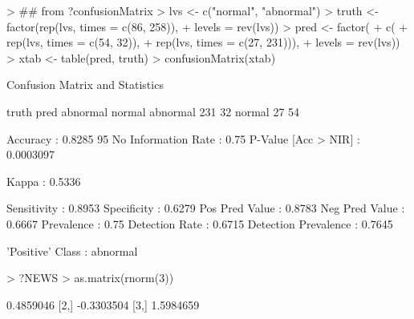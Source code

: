 \documentclass[12pt]{article}
\newenvironment{Schunk}{}{}
\begin{document}
\begin{Schunk}
\begin{Sinput}
> ## from ?confusionMatrix
> lvs <- c("normal", "abnormal")
> truth <- factor(rep(lvs, times = c(86, 258)),
+                 levels = rev(lvs))
> pred <- factor(
+                c(
+                  rep(lvs, times = c(54, 32)),
+                  rep(lvs, times = c(27, 231))),
+                levels = rev(lvs))
> xtab <- table(pred, truth)
> confusionMatrix(xtab)
\end{Sinput}
\begin{Soutput}
Confusion Matrix and Statistics

          truth
pred       abnormal normal
  abnormal      231     32
  normal         27     54
                                        
             Accuracy : 0.8285          
               95% CI : (0.7844, 0.8668)
  No Information Rate : 0.75            
  P-Value [Acc > NIR] : 0.0003097       
                                        
                Kappa : 0.5336          
                                        
          Sensitivity : 0.8953          
          Specificity : 0.6279          
       Pos Pred Value : 0.8783          
       Neg Pred Value : 0.6667          
           Prevalence : 0.75            
       Detection Rate : 0.6715          
 Detection Prevalence : 0.7645          
                                        
     'Positive' Class : abnormal        
\end{Soutput}
\begin{Sinput}
> ?NEWS
> as.matrix(rnorm(3))
\end{Sinput}
\begin{Soutput}
           [,1]
[1,]  0.4859046
[2,] -0.3303504
[3,]  1.5984659
\end{Soutput}
\end{Schunk}
\end{document}
